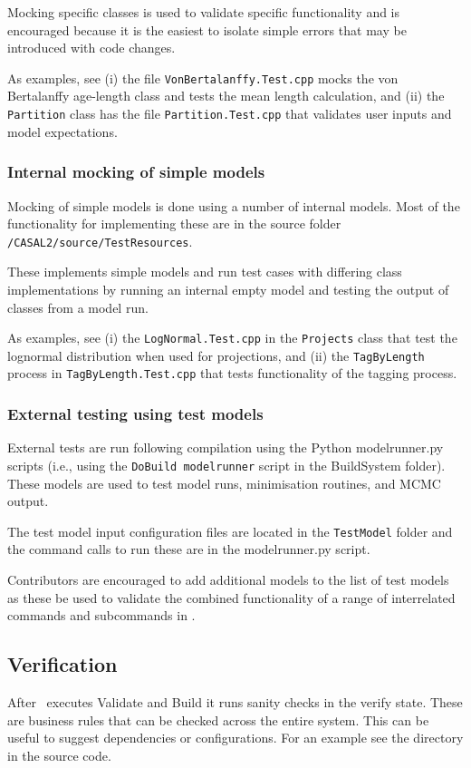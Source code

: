 Mocking specific classes is used to validate specific functionality and is encouraged because it is the easiest to isolate simple errors that may be introduced with code changes. 

As examples, see (i) the file \texttt{VonBertalanffy.Test.cpp} mocks the von Bertalanffy age-length class and tests the mean length calculation, and (ii) the \texttt{Partition} class has the file \texttt{Partition.Test.cpp} that validates user inputs and model expectations.

\subsubsection{Internal mocking of simple models}

Mocking of simple models is done using a number of internal models. Most of the functionality for implementing these are in the source folder \texttt{/CASAL2/source/TestResources}. 

These implements simple models and run test cases with differing class implementations by running an internal empty model and testing the output of classes from a model run. 

As examples, see (i) the \texttt{LogNormal.Test.cpp} in the \texttt{Projects} class that test the lognormal distribution when used for projections, and (ii) the \texttt{TagByLength} process in \texttt{TagByLength.Test.cpp} that tests functionality of the tagging process.

\subsubsection{External testing using test models}

External tests are run following compilation using the Python modelrunner.py scripts (i.e., using the \texttt{DoBuild modelrunner} script in the BuildSystem folder). These models are used to test model runs, minimisation routines, and MCMC output.

The test model input configuration files are located in the \texttt{TestModel} folder and the command calls to run these are in the modelrunner.py script.  

Contributors are encouraged to add additional models to the list of test models as these be used to validate the combined functionality of a range of interrelated commands and subcommands in \CNAME. 

\subsection{Verification}
After \CNAME\ executes Validate and Build it runs sanity checks in the verify state. These are business rules that can be checked across the entire system. This can be useful to suggest dependencies or configurations. For an example see the directory  in the source code. 

